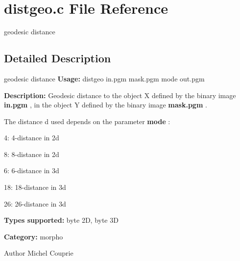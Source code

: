 \section{distgeo.c File Reference}
\label{distgeo_8c}


geodesic distance  




\subsection{Detailed Description}
geodesic distance {\bfseries Usage:} distgeo in.pgm mask.pgm mode out.pgm

{\bfseries Description:} Geodesic distance to the object X defined by the binary image {\bfseries in.pgm} , in the object Y defined by the binary image {\bfseries mask.pgm} .

The distance d used depends on the parameter {\bfseries mode} : \begin{DoxyItemize}
\item 4: 4-\/distance in 2d \item 8: 8-\/distance in 2d \item 6: 6-\/distance in 3d \item 18: 18-\/distance in 3d \item 26: 26-\/distance in 3d\end{DoxyItemize}
{\bfseries Types supported:} byte 2D, byte 3D

{\bfseries Category:} morpho

\begin{DoxyAuthor}{Author}
Michel Couprie 
\end{DoxyAuthor}
